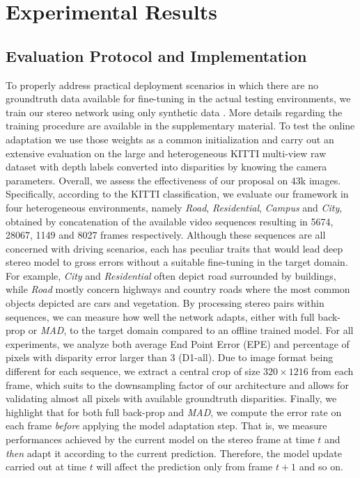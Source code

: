 \documentclass[10pt,twocolumn,letterpaper]{article}
\def\algoname{\emph{MAD}}
\def\kitti{KITTI}
\begin{document}
\section{Experimental Results}
\label{sec:results}

\subsection{Evaluation Protocol and Implementation}
\label{ssec:protocol}

To properly address practical deployment scenarios in which there are no groundtruth data available for fine-tuning in the actual testing environments, we train our stereo network using only synthetic data \cite{mayer2016large}. More details regarding the training procedure are available in the supplementary material. 
To test the online adaptation we use those weights as a common initialization and carry out an extensive evaluation on the large and heterogeneous \kitti{} multi-view raw dataset \cite{KITTI_RAW} with depth labels \cite{Uhrig2017THREEDV} converted into disparities by knowing the camera parameters. Overall, we assess the effectiveness of our proposal on 43k images. Specifically, according to the \kitti{} classification, we evaluate our framework in four heterogeneous environments, namely \emph{Road}, \emph{Residential}, \emph{Campus} and \emph{City}, obtained by concatenation of the available video sequences resulting in 5674, 28067, 1149 and 8027 frames respectively. Although these sequences are all concerned with driving scenarios, each has peculiar traits that would lead deep stereo model to gross errors without a suitable fine-tuning in the target domain. For example, \emph{City} and \emph{Residential} often depict road surrounded by buildings, while \emph{Road} mostly concern highways and country roads where the most common objects depicted are cars and vegetation. By processing stereo pairs within sequences, we can measure how well the network adapts, either with full back-prop or \algoname{}, to the target domain compared to an offline trained model.
For all experiments, we analyze both average End Point Error (EPE) and percentage of pixels with disparity error larger than 3 (D1-all). Due to image format being different for each sequence, we extract a central crop of size $320\times1216$ from each frame, which suits to the downsampling factor of our architecture and allows for validating almost all pixels with available groundtruth disparities. 
Finally, we highlight that for both full back-prop and \algoname{},  we compute the error rate on each frame \emph{before} applying the model adaptation step. That is, we measure performances achieved by the current model on the stereo frame at time $t$ and \emph{then} adapt it according to the current prediction. Therefore, the model update carried out at time $t$ will affect the prediction only from frame $t+1$ and so on. 
\end{document}

